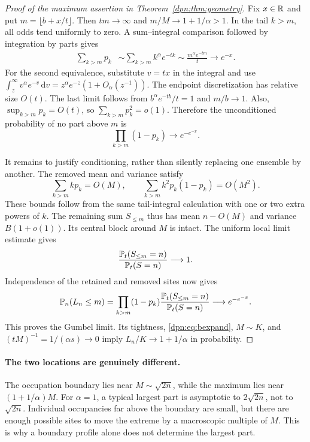 \documentclass[11pt]{article}
\numberwithin{equation}{section}
\theoremstyle{definition}\newtheorem{definition}[theorem]{Definition}
\theoremstyle{remark}\newtheorem{remark}[theorem]{Remark}
\newcommand{\dd}{\,\mathrm d}\newcommand{\ii}{\mathrm i}
\begin{document}
\begin{proof}[Proof of the maximum assertion in Theorem~\ref{dpn:thm:geometry}]
Fix $x\in\mathbb R$ and put $m=\lfloor b+x/t\rfloor$. Then $tm\to\infty$ and
$m/M\to1+1/\alpha>1$. In the tail $k>m$, all odds tend uniformly to zero.
A sum--integral comparison followed by integration by parts gives
\begin{align}\label{dpn:eq:tailint}
 \sum_{k>m}p_k
 &\sim\sum_{k>m}k^\alpha e^{-tk}
 \sim\frac{m^\alpha e^{-tm}}t
 \longrightarrow e^{-x}.
\end{align}
For the second equivalence, substitute $v=tx$ in the integral and use
$\int_z^\infty v^\alpha e^{-v}\dd v
=z^\alpha e^{-z}(1+O_\alpha(z^{-1}))$.
The endpoint discretization has relative size $O(t)$.
The last limit follows from $b^\alpha e^{-tb}/t=1$ and
$m/b\to1$. Also, $\sup_{k>m}p_k=O(t)$, so $\sum_{k>m}p_k^2=o(1)$.
Therefore the unconditioned probability of no part above $m$ is
\begin{equation}\label{dpn:eq:tailzero}
 \prod_{k>m}(1-p_k)\longrightarrow e^{-e^{-x}}.
\end{equation}

It remains to justify conditioning, rather than silently replacing one
ensemble by another. The removed mean and variance satisfy
\[
 \sum_{k>m}kp_k=O(M),\qquad
 \sum_{k>m}k^2p_k(1-p_k)=O(M^2).
\]
These bounds follow from the same tail-integral calculation with one or two
extra powers of $k$. The remaining sum $S_{\le m}$ thus has mean
$n-O(M)$ and variance $B(1+o(1))$. Its central block around $M$ is intact.
The uniform local limit estimate gives
\[
 \frac{\mathbb P_t(S_{\le m}=n)}{\mathbb P_t(S=n)}\longrightarrow1.
\]
Independence of the retained and removed sites now gives
\[
 \mathbb P_n(L_n\le m)=
       \prod_{k>m}(1-p_k)
       \frac{\mathbb P_t(S_{\le m}=n)}{\mathbb P_t(S=n)}
       \longrightarrow e^{-e^{-x}}.
\]
This proves the Gumbel limit. Its tightness, \eqref{dpn:eq:bexpand},
$M\sim K$, and $(tM)^{-1}=1/(\alpha s)\to0$ imply
$L_n/K\to1+1/\alpha$ in probability.
\end{proof}

\paragraph{The two locations are genuinely different.}
The occupation boundary lies near $M\sim\sqrt{2n}$, while the maximum lies
near $(1+1/\alpha)M$. For $\alpha=1$, a typical largest part is asymptotic
to $2\sqrt{2n}$, not to $\sqrt{2n}$. Individual occupancies far above the
boundary are small, but there are enough possible sites to move the extreme
by a macroscopic multiple of $M$. This is why a boundary profile alone does
not determine the largest part.
\end{document}
